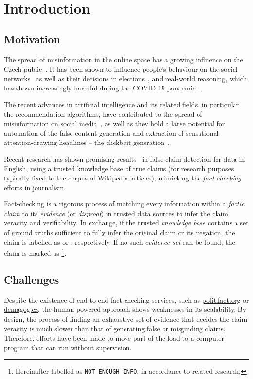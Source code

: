 
\chapter{Introduction}
\label{chap:intro}
\section{Motivation}
\label{sec:motivation}


The spread of misinformation in the online space has a growing influence on the Czech public~\cite{stem}. It has been shown to influence people's behaviour on the social networks~\cite{Lazer1094} as well as their decisions in elections~\cite{10.1257/jep.31.2.211}, and real-world reasoning, which has shown increasingly harmful during the COVID-19 pandemic~\cite{BARUA2020100119}.

The recent advances in artificial intelligence and its related fields, in particular the recommendation algorithms, have contributed to the spread of misinformation on social media~\cite{doi:10.1177/2056305119888654}, as well as they hold a large potential for automation of the false content generation and extraction of sensational attention-drawing headlines -- the \"{clickbait} generation~\cite{shukai}.

Recent research has shown promising results~\cite{fever2} in false claim detection for data in English, using a trusted knowledge base of true claims (for research purposes typically fixed to the corpus of \textsf{Wikipedia} articles), mimicking the \textit{fact-checking} efforts in journalism.

Fact-checking is a rigorous process of matching every information within a \textit{factic claim} to its \textit{evidence} (or \textit{disproof}) in trusted data sources to infer the claim veracity and verifiability. In exchange, if the trusted \textit{knowledge base} contains a set of \"{ground truths} sufficient to fully infer the original claim or its negation, the claim is labelled as {} or {}, respectively. If no such \textit{evidence set} can be found, the claim is marked as {}\footnote{Hereinafter labelled as \texttt{NOT ENOUGH INFO}, in accordance to related research.}.


\section{Challenges}
Despite the existence of end-to-end fact-checking services, such as \url{politifact.org} or \url{demagog.cz}, the human-powered approach shows weaknesses in its scalability. By design, the process of finding an exhaustive set of evidence that decides the claim veracity is much slower than that of generating false or misguiding claims. Therefore, efforts have been made to move part of the load to a computer program that can run without supervision.


